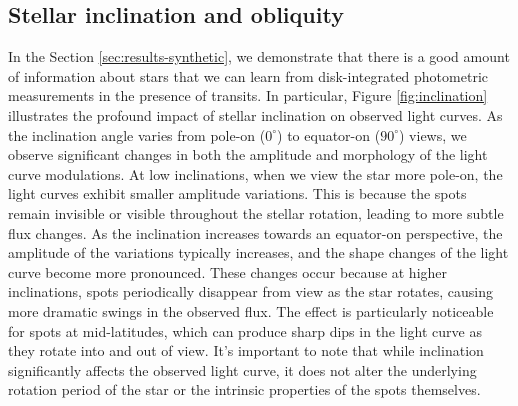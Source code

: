 \documentclass[twocolumn]{aastex631}
\begin{document}
\subsection{Stellar inclination and obliquity}
\label{sec:obl-inc}
In the Section \ref{sec:results-synthetic}, we demonstrate
that there is a good amount of information
about stars that we can learn from disk-integrated photometric measurements
in the presence of transits. In particular, Figure
\ref{fig:inclination} illustrates the profound impact of stellar inclination on
observed light curves. As the inclination angle varies from pole-on ($0^\circ$)
to equator-on ($90^\circ$) views, we observe significant changes in both the
amplitude and morphology of the light curve modulations. At low inclinations,
when we view the star more pole-on, the light curves exhibit smaller amplitude
variations. This is because the spots remain invisible or
visible throughout the stellar rotation, leading to more subtle flux changes.
As the inclination increases towards an equator-on perspective, the amplitude of
the variations typically increases, and the shape changes of the
light curve become more pronounced. These changes occur
because at higher inclinations, spots periodically disappear from view as the
star rotates, causing more dramatic swings in the observed flux. The effect is
particularly noticeable for spots at mid-latitudes, which can produce sharp dips
in the light curve as they rotate into and out of view. It's important to note
that while inclination significantly affects the observed light curve, it does
not alter the underlying rotation period of the star or the intrinsic properties
of the spots themselves.
\end{document}
